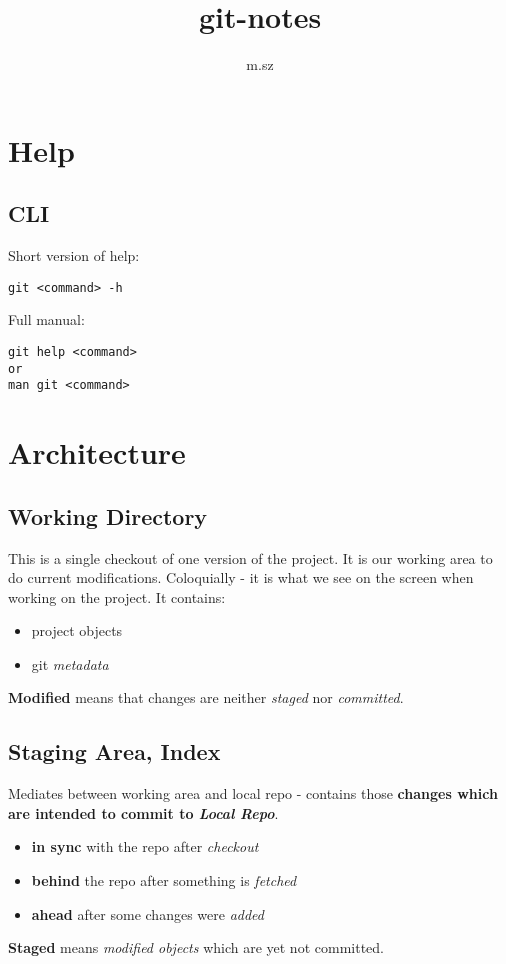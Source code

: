 \documentclass{report}
\title{git-notes}
\author{m.sz}
\begin{document}
\maketitle
{}
\tableofcontents



\part{Help}


\chapter{CLI}
Short version of help:
\begin{verbatim}
git <command> -h
\end{verbatim}
Full manual:
\begin{verbatim}
git help <command>
or
man git <command>
\end{verbatim}



\part{Architecture}


\chapter{Working Directory}
This is a single checkout of one version of the project. It is our working area to do current modifications. Coloquially -
it is what we see on the screen when working on the project. It contains:
\begin{itemize}
	\item project objects
	\item git \textit{metadata}
\end{itemize}
\textbf{Modified} means that changes are neither \textit{staged} nor \textit{committed}.


\chapter{Staging Area, Index}
Mediates between working area and local repo - contains those \textbf{changes which are intended to commit to \textit{Local Repo}}. 
\begin{itemize}
	\item \textbf{in sync }with the repo after \textit{checkout}
	\item \textbf{behind} the repo after something is \textit{fetched}
	\item \textbf{ahead} after some changes were \textit{added}
\end{itemize}
\textbf{Staged} means \textit{modified objects} which are yet not committed.
	
\end{document}

